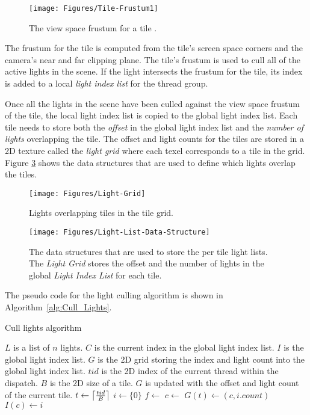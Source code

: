 \begin{figure}[H]
\centering
\texttt{[image: Figures/Tile-Frustum1]}
\decoRule
\caption[Tile Frustum]{The view space frustum for a tile \parencite{17_vanoosten_2015}.}
\label{fig:Tile-Frustum}
\end{figure}

The frustum for the tile is computed from the tile's screen space corners and the camera's near and far clipping plane. The tile's frustum is used to cull all of the active lights in the scene. If the light intersects the frustum for the tile, its index is added to a local \emph{light index list} for the thread group.

Once all the lights in the scene have been culled against the view space frustum of the tile, the local light index list is copied to the global light index list. Each tile needs to store both the \emph{offset} in the global light index list and the \emph{number of lights} overlapping the tile. The offset and light counts for the tiles are stored in a 2D texture called the \emph{light grid} where each texel corresponds to a tile in the grid. Figure \ref{fig:Light-List-Data-Structure} shows the data structures that are used to define which lights overlap the tiles.

\begin{figure}[H]
\centering
\texttt{[image: Figures/Light-Grid]}
\decoRule
\caption[Light Grid]{Lights overlapping tiles in the tile grid.}
\label{fig:Light-Grid}
\end{figure}

\begin{figure}[h]
\centering
\texttt{[image: Figures/Light-List-Data-Structure]}
\decoRule
\caption{The data structures that are used to store the per tile light lists. The \emph{Light Grid} stores the offset and the number of lights in the global \emph{Light Index List} for each tile.}
\label{fig:Light-List-Data-Structure}
\end{figure}

The pseudo code for the light culling algorithm is shown in Algorithm~\ref{alg:Cull_Lights}.

\begin{algorithm}[H]
\caption{Cull lights algorithm}
\label{alg:Cull_Lights}
\begin{algorithmic}[1]
\Require $L$ is a list of $n$ lights.
\Require $C$ is the current index in the global light index list.
\Require $I$ is the global light index list.
\Require $G$ is the 2D grid storing the index and light count into the global light index list.
\Require $tid$ is the 2D index of the current thread within the dispatch.
\Require $B$ is the 2D size of a tile.
\Ensure $G$ is updated with the offset and light count of the current tile.
\State $t \gets \ceil*{\frac{tid}{B}}$
\State $i \gets \{0\}$ 
\State $f \gets$ 
\State {} 
\EndIf
\EndFor
\State $c \gets$ 
\State $G(t) \gets (c, i.count)$
\State $I(c) \gets i$
\EndFunction
\end{algorithmic}
\end{algorithm}

